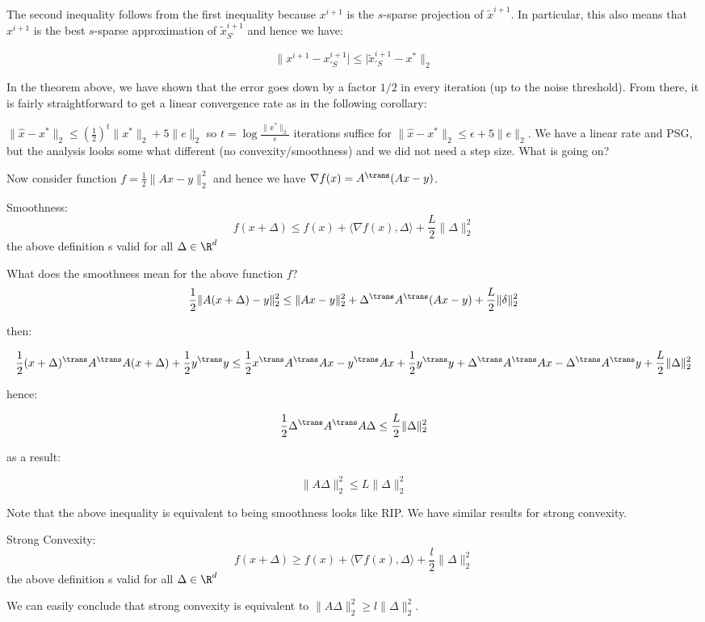 The second inequality follows from the first inequality because $x^{i+1}$ is the $s$-sparse projection of $\tilde x^{i+1}$. In particular, this also means that $x^{i+1}$ is the best $s$-sparse approximation of $\tilde x_{S\prime}^{i+1}$ and hence we have:

$$\| x^{i+1} - x_{\prime S}^{i+1} | \leq |\tilde x_{\prime S}^{i+1} -x^*\|_2$$ 

In the theorem above, we have shown that the error goes down by a factor $1/2$ in every iteration (up to the noise threshold). From there, it is fairly straightforward to get a linear convergence rate as in the following corollary:
\begin{corollary}
$\| \hat x - x^*\|_2 \leq (\frac{1}{2})^t \|x^* \|_2 + 5\|e\|_2$
so $t = \log \frac{\| x^*\|_2}{\epsilon}$ iterations suffice for $\| \hat x - x^*\|_2 \leq \epsilon + 5\|e\|_2$.
 We have a linear rate and PSG, but the analysis looks some what different (no convexity/smoothness) and we did not need a step size. What is going on?
\end{corollary}
Now consider function $f =  \frac{1}{2}\|Ax-y \|_2^2$ and hence we have $\nabla f(x) = A^{\trans}(Ax-y)$.

\begin{definition}
Smoothness:
$$f(x+\Delta) \leq f(x) + \langle \nabla f(x), \Delta \rangle + \frac{L}{2} \| \Delta\|_2^2 $$
the above definition s valid for all $\Delta \in \R^d$  
\end{definition}

What does the smoothness mean for the above function $f$?
$$\frac{1}{2}\|A(x+\Delta) - y\|_2^2 \leq \|Ax-y\|_2^2 + \Delta^{\trans} A^{\trans}(Ax-y) + \frac{L}{2}\|\delta\|_2^2$$

then:

$$\frac{1}{2}(x+\Delta)^{\trans} A^{\trans}A(x+\Delta) + \frac{1}{2}y^{\trans} y \leq \frac{1}{2} x^{\trans} A^{\trans} Ax-y^{\trans} Ax + \frac{1}{2}y^{\trans} y + \Delta^{\trans} A^{\trans} Ax- \Delta^{\trans} A^{\trans} y + \frac{L}{2} \|\Delta\|_2^2 $$

hence:

$$\frac{1}{2}\Delta^{\trans} A^{\trans} A \Delta \leq \frac{L}{2}\|\Delta\|_2^2$$

as a result:

$$\|A\Delta \|_2^2 \leq L\|\Delta\|_2^2$$

Note that the above inequality is equivalent to being smoothness looks like RIP.
We have similar results for strong convexity.
\begin{definition}
Strong Convexity:
$$f(x+\Delta) \geq f(x) + \langle \nabla f(x), \Delta \rangle + \frac{l}{2} \| \Delta\|_2^2 $$
the above definition s valid for all $\Delta \in \R^d$  
\end{definition}
We can easily conclude that strong convexity is equivalent to $\|A\Delta \|_2^2 \geq l\|\Delta\|_2^2$.

